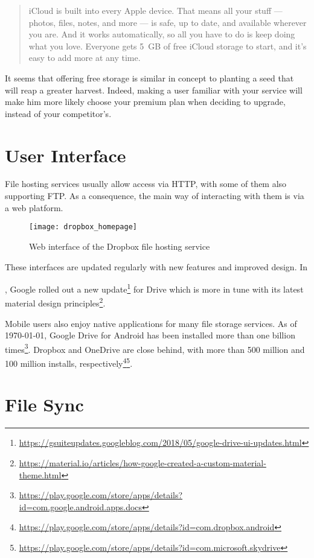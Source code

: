 \begin{quote}
iCloud is built into every Apple device. That means all your stuff — photos, files, notes, and more — is safe, up to date, and available wherever you are. And it works automatically, so all you have to do is keep doing what you love. Everyone gets \mbox{5 GB} of free iCloud storage to start, and it’s easy to add more at any time.
\end{quote}

It seems that offering free storage is similar in concept to planting a seed that will reap a greater harvest. Indeed, making a user familiar with your service will make him more likely choose your premium plan when deciding to upgrade, instead of your competitor's.

\section{User Interface}

File hosting services usually allow access via \mbox{HTTP}, with some of them also supporting \mbox{FTP}. As a consequence, the main way of interacting with them is via a web platform.

\begin{figure}[h]
\caption{Web interface of the Dropbox file hosting service}
\centering
\texttt{[image: dropbox\_homepage]}
\end{figure}

These interfaces are updated regularly with new features and improved design. In \date{May 2018}, Google rolled out a new update\footnote{\url{https://gsuiteupdates.googleblog.com/2018/05/google-drive-ui-updates.html}} for Drive which is more in tune with its latest material design principles\footnote{\url{https://material.io/articles/how-google-created-a-custom-material-theme.html}}.

Mobile users also enjoy native applications for many file storage services. As of \monthyeardate\today, Google Drive for Android has been installed more than one billion times\footnote{\url{https://play.google.com/store/apps/details?id=com.google.android.apps.docs}}. Dropbox and OneDrive are close behind, with more than 500 million and 100 million installs, respectively\footnote{\url{https://play.google.com/store/apps/details?id=com.dropbox.android}}\footnote{\url{https://play.google.com/store/apps/details?id=com.microsoft.skydrive}}.

\section{File Sync}


